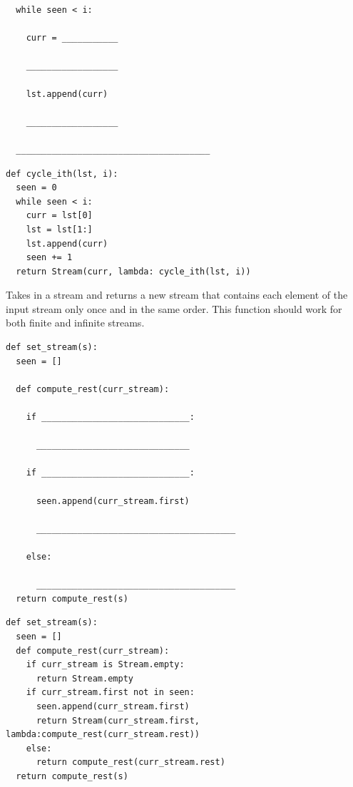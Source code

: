 \documentclass{exam}
\begin{document}
\begin{questions}
\begin{lstlisting}
  while seen < i:

    curr = ___________

    __________________

    lst.append(curr)

    __________________

  ______________________________________
\end{lstlisting}
\begin{solution}
\begin{lstlisting}
def cycle_ith(lst, i):
  seen = 0
  while seen < i:
    curr = lst[0]
    lst = lst[1:]
    lst.append(curr)
    seen += 1
  return Stream(curr, lambda: cycle_ith(lst, i))
\end{lstlisting}
\end{solution}

\item Takes in a stream and returns a new stream that contains each element of the input stream only once and in the same order. This function should work for both finite and infinite streams.
\newline
\begin{lstlisting}
def set_stream(s):
  seen = []

  def compute_rest(curr_stream):

    if _____________________________:

      ______________________________

    if _____________________________:

      seen.append(curr_stream.first)

      _______________________________________

    else:

      _______________________________________
  return compute_rest(s)
\end{lstlisting}
\begin{solution}
\begin{lstlisting}
def set_stream(s):
  seen = []
  def compute_rest(curr_stream):
    if curr_stream is Stream.empty:
      return Stream.empty
    if curr_stream.first not in seen:
      seen.append(curr_stream.first)
      return Stream(curr_stream.first, lambda:compute_rest(curr_stream.rest))
    else:
      return compute_rest(curr_stream.rest)
  return compute_rest(s)
\end{lstlisting}
\end{solution}
\end{questions}
\end{document}
